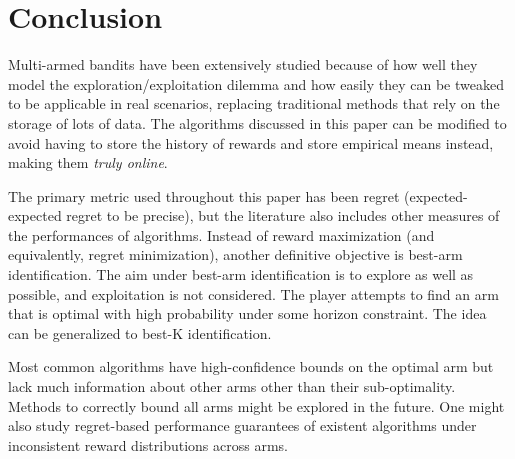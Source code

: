 \documentclass[conference]{IEEEtran}
\begin{document}
\section{Conclusion}
Multi-armed bandits have been extensively studied because of how well they model the exploration/exploitation dilemma and how easily they can be tweaked to be applicable in real scenarios, replacing traditional methods that rely on the storage of lots of data. The algorithms discussed in this paper can be modified to avoid having to store the history of rewards and store empirical means instead, making them \textit{truly online}.

The primary metric used throughout this paper has been regret (expected-expected regret to be precise), but the literature also includes other measures of the performances of algorithms. Instead of reward maximization (and equivalently, regret minimization), another definitive objective is best-arm identification. The aim under best-arm identification is to explore as well as possible, and exploitation is not considered. The player attempts to find an arm that is optimal with high probability under some horizon constraint. The idea can be generalized to best-K identification.

Most common algorithms have high-confidence bounds on the optimal arm but lack much information about other arms other than their sub-optimality. Methods to correctly bound all arms might be explored in the future. One might also study regret-based performance guarantees of existent algorithms under inconsistent reward distributions across arms.
\printbibliography
\end{document}
